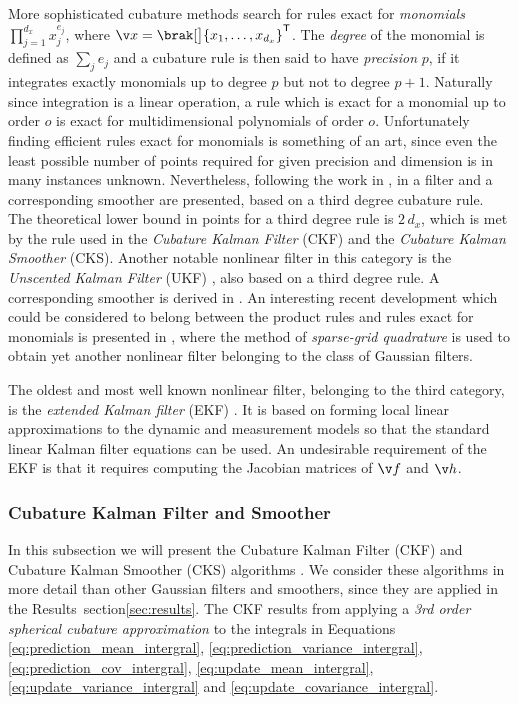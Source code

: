 More sophisticated cubature methods search for rules
exact for \emph{monomials} $\prod_{j=1}^{d_x} x_j^{e_j}$, where $\x=\brak[\big]{x_1,\dots,x_{d_x}}^\tr$. 
The \emph{degree} of the monomial is defined as $\sum_j e_j$ and a cubature rule is then said to have
\emph{precision} $p$, if it integrates exactly monomials up to degree $p$ but not
to degree $p+1$. Naturally since integration is a linear operation, a rule which is exact 
for a monomial up to order $o$ is exact for multidimensional polynomials of order $o$.
Unfortunately finding efficient rules exact for monomials is something of an art, since
even the least possible number of points required for given precision and dimension is in many
instances unknown. Nevertheless, following the work in \textcite{Wu2006}, in \textcite{Arasaratnam2009,Arasaratnam2011} a filter
and a corresponding smoother are presented, based on a third degree 
cubature rule. The theoretical lower bound in points for a third degree rule
is $2\,d_x$, which is met by the rule used in the \emph{Cubature Kalman Filter} (CKF) and
the \emph{Cubature Kalman Smoother} (CKS). Another notable nonlinear filter in this
category is the \emph{Unscented Kalman Filter} (UKF) 
\parencite{julier1997new,Julier2000a,Merwe2004}, 
also based on a third degree rule. A corresponding smoother is derived in \textcite{Sarkka2008a}.
An interesting recent development which could be considered to belong between
the product rules and rules exact for monomials is presented in \textcite{Jia2012},
where the method of \emph{sparse-grid quadrature} is used to obtain yet another
nonlinear filter belonging to the class of Gaussian filters.

The oldest and most well known nonlinear filter, belonging to the third category, is
the \emph{extended Kalman filter} (EKF) \parencite{jazwinski1970stochastic}. 
It is based on forming local linear approximations to the dynamic
and measurement models so that the standard linear Kalman filter equations can be used.
An undesirable requirement of the EKF is that it requires computing
the Jacobian matrices of $\f$ and $\h$.

\subsubsection{Cubature Kalman Filter and Smoother}\label{sec:ckf}
In this subsection we will present the Cubature Kalman Filter (CKF)
and Cubature Kalman Smoother (CKS) algorithms \parencite{Arasaratnam2011,Arasaratnam2009}.
We consider these algorithms in more detail than other Gaussian filters and smoothers, since
they are applied in the Results~section\ref{sec:results}. The CKF results from
applying a \emph{3rd order spherical cubature approximation} to the integrals 
in Eequations \eqref{eq:prediction_mean_intergral}, \eqref{eq:prediction_variance_intergral},
\eqref{eq:prediction_cov_intergral}, \eqref{eq:update_mean_intergral}, \eqref{eq:update_variance_intergral} and
\eqref{eq:update_covariance_intergral}.

